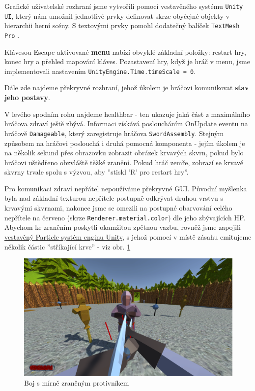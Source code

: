 Grafické uživatelské rozhraní jsme vytvořili pomocí vestavěného systému \texttt{Unity UI}, který nám umožnil jednotlivé prvky definovat skrze obyčejné objekty v hierarchii herní scény. S textovými prvky pomohl dodatečný balíček \texttt{TextMesh Pro} \cite{TextMeshPro}.
\bigbreak

Klávesou Escape aktivované \textbf{menu} nabízí obvyklé základní položky: restart hry, konec hry a přehled mapování kláves.
Pozastavení hry, když je hráč v menu, jsme implementovali nastavením \texttt{UnityEngine.Time.timeScale = 0}.
\bigbreak

Dále zde najdeme překryvné rozhraní, jehož úkolem je hráčovi komunikovat \textbf{stav jeho postavy}. 

V levého spodním rohu najdeme healthbar - ten ukazuje jaká část z maximálního hráčova zdraví ještě zbývá. Informaci získává posloucháním OnUpdate eventu na hráčově \texttt{Damageable}, který zaregistruje hráčova \texttt{SwordAssembly}. Stejným způsobem na hráčovi poslouchá i druhá pomocná komponenta - jejím úkolem je na několik sekund přes obrazovku zobrazit obrázek krvavých skvrn, pokud bylo hráčovi uštědřeno obzvláště těžké zranění. Pokud hráč zemře, zobrazí se krvavé skvrny trvale spolu s výzvou, aby ''stiskl 'R' pro restart hry''.

Pro komunikaci zdraví nepřátel nepoužíváme překryvné GUI. Původní myšlenka byla nad základní texturou nepřítele postupně odkrývat druhou vrstvu s krvavými skvrnami, nakonec jsme se omezili na postupné obarvování celého nepřítele na červeno (skrze \texttt{Renderer.material.color}) dle jeho zbývajících HP. Abychom ke zraněním poskytli okamžitou zpětnou vazbu, rovněž jsme zapojili \href{https://docs.unity3d.com/2022.2/Documentation/Manual/Built-inParticleSystem.html}{vestavěný Particle systém enginu Unity}, s jehož pomocí v místě zásahu emitujeme několik částic ''stříkající krve'' - viz obr. \ref{obr05:demogameEnemyBloodied}

\begin{figure}[!h]\centering
  \center
  \includegraphics[width=140mm]{../img/demogameFightEnemyBloodied.png}
  \caption{Boj s mírně zraněným protivníkem}
  \label{obr05:demogameEnemyBloodied}
\end{figure} 

